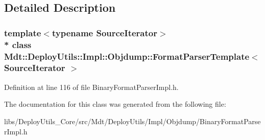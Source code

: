 \subsection{Detailed Description}
\subsubsection*{template$<$typename Source\+Iterator$>$\\*
class Mdt\+::\+Deploy\+Utils\+::\+Impl\+::\+Objdump\+::\+Format\+Parser\+Template$<$ Source\+Iterator $>$}



Definition at line 116 of file Binary\+Format\+Parser\+Impl.\+h.



The documentation for this class was generated from the following file\+:\begin{DoxyCompactItemize}
\item 
libs/\+Deploy\+Utils\+\_\+\+Core/src/\+Mdt/\+Deploy\+Utils/\+Impl/\+Objdump/Binary\+Format\+Parser\+Impl.\+h\end{DoxyCompactItemize}
